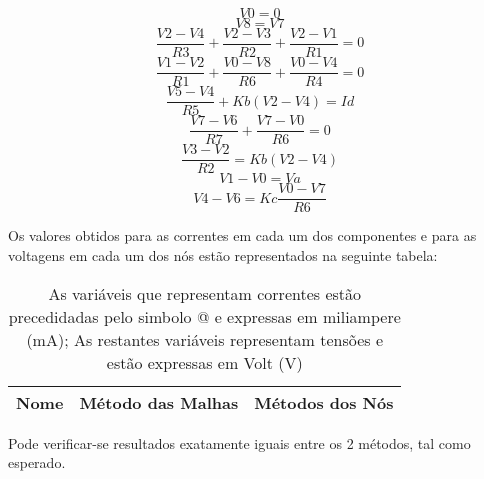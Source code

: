 \begin {equation}
	V0 = 0
	\label{eq1}
\end{equation}
\begin {equation}
	V8 = V7
	\label{eqn}
\end{equation}
\begin {equation}
	\frac{V2-V4}{R3} + \frac{V2-V3}{R2} + \frac{V2-V1}{R1} = 0
	\label{eq4}
\end{equation}
\begin {equation}
	\frac{V1-V2}{R1} + \frac{V0 - V8}{R6} + \frac{V0 - V4}{R4} = 0
	\label{eq3}
\end{equation}
\begin {equation}
	\frac{V5-V4}{R5} + Kb(V2-V4) = Id
	\label{eq6}

\end{equation}
\begin {equation}
	\frac{V7-V6}{R7} + \frac{V7 - V0}{R6} = 0
	\label{eq7}
\end{equation}
\begin {equation}
	\frac{V3-V2}{R2} = Kb(V2-V4) 
	\label{eq5}
\end{equation}
\begin {equation}
	V1 - V0 = Va
	\label{eq8}
\end{equation}
\begin {equation}
	V4 - V6 = Kc \frac{V0 - V7}{R6}
	\label{eq9}
\end{equation}

Os valores obtidos para as correntes em cada um dos componentes e para as voltagens em cada um dos nós estão representados na seguinte tabela:
 \pagebreak 
\begin{table}[h]
  \centering
  \begin{tabular}{|l|r|r|}
    \hline    
    {\bf Nome} & {\bf Método das Malhas} & {\bf Métodos dos Nós}\\ \hline
    
  \end{tabular}
  \caption{As variáveis que representam correntes estão precedidadas pelo simbolo @ e expressas em miliampere (mA); As restantes variáveis representam tensões e estão expressas em Volt (V)}
  \label{tab:valores_teoricos}
\end{table}

Pode verificar-se resultados exatamente iguais entre os 2 métodos, tal como esperado.


